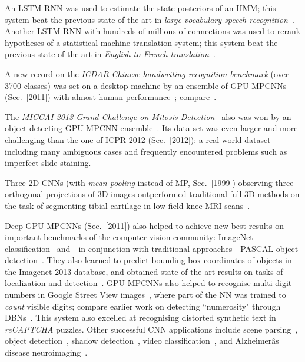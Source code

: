 \documentclass[letterpaper]{article}
\begin{document}
\begin{sloppypar}
An LSTM RNN was used to estimate the state posteriors of an HMM; this system
 beat the previous state of the art in {\em large vocabulary speech recognition}~\citep{sak2014,sak2014large}. 
Another LSTM RNN with hundreds of millions of connections was used to rerank hypotheses of a statistical machine translation system; this system
beat the previous state of the art in {\em English to French translation}~\citep{sutskever2014}.

A new record on the {\em ICDAR Chinese handwriting recognition 
benchmark} (over 3700 classes) was set on a desktop machine
by an ensemble of GPU-MPCNNs (Sec.~\ref{2011}) with almost human performance~\citep{chinese2013};
compare~\citep{icdar2013}.

The {\em MICCAI 2013 Grand Challenge on Mitosis Detection}~\citep{miccai13}
also was won by an object-detecting  GPU-MPCNN ensemble~\citep{miccai2013}.
Its data set was even larger and more challenging than the one of ICPR 2012 (Sec.~\ref{2012}): a real-world dataset including many ambiguous cases and frequently encountered problems such as imperfect slide staining. 

Three 2D-CNNs (with {\em mean-pooling} instead of MP, Sec.~\ref{1999}) observing three orthogonal projections of 3D images
outperformed traditional full 3D methods on the task of segmenting tibial
cartilage in low field knee MRI scans~\citep{prasoon:13}.
 


Deep GPU-MPCNNs (Sec.~\ref{2011}) also helped to achieve new best results
on important benchmarks of the computer vision community:
ImageNet classification~\citep{zeiler2013,szegedy2014} 
and---in 
conjunction with traditional 
approaches---PASCAL object detection~\citep{malik2013}.
They also learned to predict bounding box coordinates  of
 objects in the Imagenet 2013 database,
and obtained state-of-the-art results on tasks of localization and 
detection~\citep{sermanet2013}.
GPU-MPCNNs also helped to recognise
multi-digit numbers  in Google Street View images~\citep{goodfellow2014multi},
where part of the NN was trained to {\em count} visible digits;
compare earlier work on detecting ``numerosity" through DBNs~\citep{stoianov2012}.
This system also excelled at recognising distorted synthetic text in {\em reCAPTCHA} puzzles.
Other successful CNN applications include 
scene parsing~\citep{Farabet2013}, object detection~\citep{Szegedy2013},
shadow detection~\citep{khan2014},
video classification~\citep{karpathy2014},
and Alzheimerâs disease neuroimaging~\citep{shuiwang2014}.





\end{sloppypar}
\end{document}
